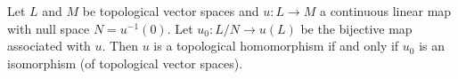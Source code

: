 Let $L$ and $M$ be topological vector spaces and $u: L \to M$ a continuous linear map with null space $N = u^{-1}(0)$. Let $u_0: L/N \to u(L)$ be the bijective map associated with $u$. Then $u$ is a topological homomorphism if and only if $u_0$ is an isomorphism (of topological vector spaces).
